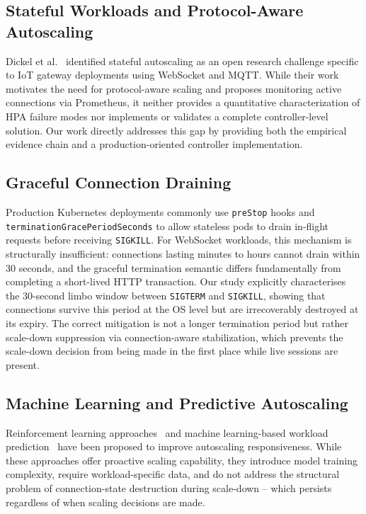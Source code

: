 \documentclass[twocolumn]{svjour3}
\begin{document}
\subsection{Stateful Workloads and Protocol-Aware Autoscaling}

Dickel et al.~\cite{dickel2019stateful} identified stateful autoscaling as an open research challenge specific to IoT gateway deployments using WebSocket and MQTT. While their work motivates the need for protocol-aware scaling and proposes monitoring active connections via Prometheus, it neither provides a quantitative characterization of HPA failure modes nor implements or validates a complete controller-level solution. Our work directly addresses this gap by providing both the empirical evidence chain and a production-oriented controller implementation.

\subsection{Graceful Connection Draining}

Production Kubernetes deployments commonly use \texttt{preStop} hooks and \texttt{terminationGracePeriodSeconds} to allow stateless pods to drain in-flight requests before receiving \texttt{SIGKILL}. For WebSocket workloads, this mechanism is structurally insufficient: connections lasting minutes to hours cannot drain within 30 seconds, and the graceful termination semantic differs fundamentally from completing a short-lived HTTP transaction. Our study explicitly characterises the 30-second limbo window between \texttt{SIGTERM} and \texttt{SIGKILL}, showing that connections survive this period at the OS level but are irrecoverably destroyed at its expiry. The correct mitigation is not a longer termination period but rather scale-down suppression via connection-aware stabilization, which prevents the scale-down decision from being made in the first place while live sessions are present.

\subsection{Machine Learning and Predictive Autoscaling}

Reinforcement learning approaches~\cite{rossi2020horizontal,imdoukh2020machine} and machine learning-based workload prediction~\cite{toka2021machine,zhong2020machine} have been proposed to improve autoscaling responsiveness. While these approaches offer proactive scaling capability, they introduce model training complexity, require workload-specific data, and do not address the structural problem of connection-state destruction during scale-down -- which persists regardless of when scaling decisions are made.
\end{document}
